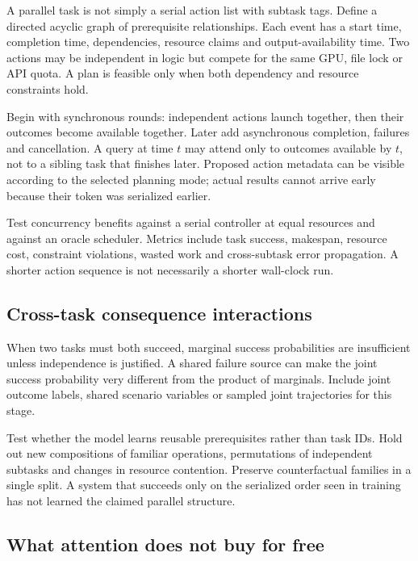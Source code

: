\documentclass[
  11pt,
  a4paper,
]{article}
\begin{document}
A parallel task is not simply a serial action list with subtask tags.
Define a directed acyclic graph of prerequisite relationships. Each
event has a start time, completion time, dependencies, resource claims
and output-availability time. Two actions may be independent in logic
but compete for the same GPU, file lock or API quota. A plan is feasible
only when both dependency and resource constraints hold.

Begin with synchronous rounds: independent actions launch together, then
their outcomes become available together. Later add asynchronous
completion, failures and cancellation. A query at time \(t\) may attend
only to outcomes available by \(t\), not to a sibling task that finishes
later. Proposed action metadata can be visible according to the selected
planning mode; actual results cannot arrive early because their token
was serialized earlier.

Test concurrency benefits against a serial controller at equal resources
and against an oracle scheduler. Metrics include task success, makespan,
resource cost, constraint violations, wasted work and cross-subtask
error propagation. A shorter action sequence is not necessarily a
shorter wall-clock run.

\subsection{Cross-task consequence
interactions}\label{cross-task-consequence-interactions}

When two tasks must both succeed, marginal success probabilities are
insufficient unless independence is justified. A shared failure source
can make the joint success probability very different from the product
of marginals. Include joint outcome labels, shared scenario variables or
sampled joint trajectories for this stage.

Test whether the model learns reusable prerequisites rather than task
IDs. Hold out new compositions of familiar operations, permutations of
independent subtasks and changes in resource contention. Preserve
counterfactual families in a single split. A system that succeeds only
on the serialized order seen in training has not learned the claimed
parallel structure.

\subsection{What attention does not buy for
free}\label{what-attention-does-not-buy-for-free}
\end{document}

